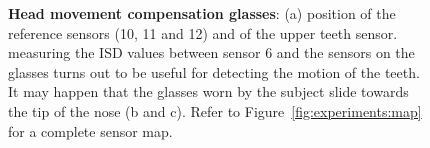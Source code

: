 \begin{figure}
	\centering
		\hspace{0.05\textwidth}
		\hspace{0.05\textwidth}
	\caption[Head movement compensation glasses]{\textbf{Head movement
	compensation glasses}: (a) position of the reference sensors (10, 11 and 12)
	and of the upper teeth sensor. 
	measuring the ISD values between sensor 6 and the sensors on the glasses
	turns out to be useful for detecting the motion of the teeth. It may happen
	that the glasses worn by the subject slide towards the tip of the nose (b
	and c). Refer to Figure~\ref{fig:experiments:map} for a complete sensor
	map.}
	\label{fig:linguometer:technical:glasses}
\end{figure}
